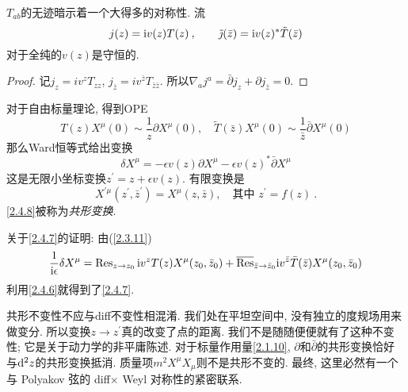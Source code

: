 $T_{ab}$的无迹暗示着一个大得多的对称性. 流
\begin{equation}
j(z)=\mathrm{i} v(z) T(z) \:, \qquad \tilde{\jmath}(\bar{z})=\mathrm{i} v(z)^{*} \tilde{T}(\bar{z}) \label{2.4.5}
\end{equation}
对于全纯的$v(z)$是守恒的.
\begin{tcolorbox}
	\begin{proof}
		记$j_{z}=i v^{z} T_{z z}$, $j_{\bar{z}}=i v^{\bar{z}} T_{\bar{z} \bar{z}}$. 所以$
		\nabla_{a} j^{a}= \bar{\partial} j_{z}+\partial j_{\bar{z}}=0$.
		\end{proof}	
\end{tcolorbox}
对于自由标量理论, 得到OPE
\begin{equation} \label{2.4.6}
T(z) X^{\mu}(0) \sim \frac{1}{z} \partial X^{\mu}(0), \quad \tilde{T}(\bar{z}) X^{\mu}(0) \sim \frac{1}{\bar{z}} \bar{\partial} X^{\mu}(0)
\end{equation}
那么Ward恒等式给出变换
\begin{equation}\label{2.4.7}
\delta X^{\mu}=-\epsilon v(z) \partial X^{\mu}-\epsilon v(z)^{*} \bar{\partial} X^{\mu}
\end{equation}
这是无限小坐标变换$z^{\prime}=z+\epsilon v(z)$. 
有限变换是
\begin{equation} \label{2.4.8}
X^{\prime \mu}\left(z^{\prime}, \bar{z}^{\prime}\right)=X^{\mu}(z, \bar{z}), \quad \text{其中 }z^{\prime}=f(z) \:.
\end{equation}
\eqref{2.4.8}被称为\emph{共形变换}.
\begin{tcolorbox}
		关于\eqref{2.4.7}的证明: 由(\ref{2.3.11})
		$$
		\frac{1}{\mathrm{i} \epsilon} \delta X^{\mu}=\operatorname{Res}_{z \rightarrow z_{0}} \mathrm{i} v^{z} T(z) X^{\mu}(z_{0},\bar{z}_{0})+
		\overline{\operatorname{Res}}_{\bar{z} \rightarrow \bar{z}_{0}} \mathrm{i} v^{\bar{z}} \bar{T}(\bar{z}) X^{\mu}(z_{0},\bar{z}_{0})
		$$
		利用\eqref{2.4.6}就得到了\eqref{2.4.7}.
\end{tcolorbox}


共形不变性不应与diff不变性相混淆. 我们处在平坦空间中, 没有独立的度规场用来做变分. 所以变换$z\to z^\prime$真的改变了点的距离. 我们不是随随便便就有了这种不变性; 它是关于动力学的非平庸陈述. 对于标量作用量\eqref{2.1.10}, $\partial$和$\bar{\partial}$的共形变换恰好与$\mathrm{d}^2 z$的共形变换抵消. 质量项$m^{2} X^{\mu} X_{\mu}$则不是共形不变的.
最终, 这里必然有一个与 Polyakov 弦的 diff$\times$ Weyl 对称性的紧密联系.

